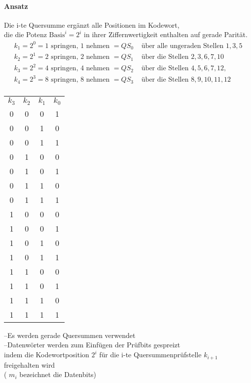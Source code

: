 \documentclass[a4paper]{scrartcl}
\begin{document}
					\paragraph{Ansatz}
						Die i-te Quersumme ergänzt alle Positionen im Kodewort,\\
						die die Potenz \(\text{Basis}^i = 2^i  \) in ihrer Ziffernwertigkeit enthalten auf gerade Parität.\\
						\begin{align*}
							k_1 = 2^0 = 1 \text{ springen, 1 nehmen } =  QS_0 &\text{ über alle ungeraden Stellen } 1,3,5 \\
							k_2 = 2^1 = 2 \text{ springen, 2 nehmen } =  QS_1 &\text{ über die Stellen } 2,3,6,7, 10 \\
							k_3 = 2^2 = 4 \text{ springen, 4 nehmen } = QS_2 &\text{ über die Stellen } 4, 5, 6, 7, 12,  \\
							k_4 = 2^3 =  8 \text{ springen, 8 nehmen } = QS_3 &\text{ über die Stellen } 8, 9, 10, 11, 12 \\
						\end{align*}
						
						\begin{table}[H]
							\centering
							\begin{tabular}{c c c c}
								\(k_3\) &\(k_2\) & \(k_1\)& \( k_0 \)\\
								0&0&0&1\\
								0&0&1&0\\
								0&0&1&1\\
								0&1&0&0\\
								0&1&0&1\\
								0&1&1&0\\
								0&1&1&1\\
								1&0&0&0\\
								1&0&0&1\\
								1&0&1&0\\
								1&0&1&1\\
								1&1&0&0\\
								1&1&0&1\\
								1&1&1&0\\
								1&1&1&1\\
							\end{tabular}
						\end{table}
					
					--Es werden gerade Quersummen verwendet\\
					--Datenwörter werden zum Einfügen der Prüfbits gespreizt\\
					indem die Kodewortposition \( 2^i \) für die i-te Quersummenprüfstelle \( k_{i+1} \) freigehalten wird \\
					( \( m_i  \) bezeichnet die Datenbits)\\
					
\end{document}
